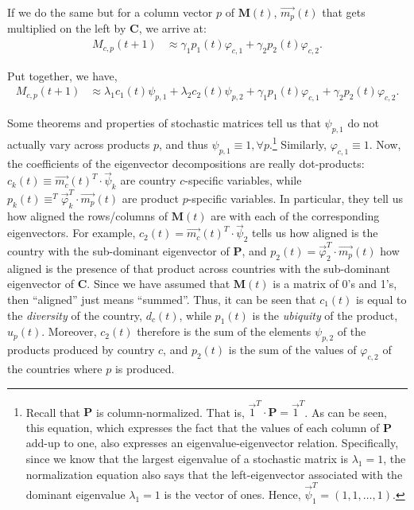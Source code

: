 \documentclass[12pt]{article}
\newcommand{\mtx}[1]{\mathbf{ #1}}
\begin{document}
If we do the same but for a column vector $p$ of $\mtx{M}(t)$, $\vec{m_p}(t)$ that gets multiplied on the left by $\mtx{C}$, we arrive at:
\begin{align*}
	M_{c,p}(t+1) &\approx \gamma_1 p_1(t) \varphi_{c,1} + \gamma_2 p_2(t) \varphi_{c,2}.
\end{align*}

Put together, we have,
\begin{align}
	M_{c,p}(t+1) &\approx \lambda_1 c_1(t) \psi_{p,1} + \lambda_2 c_2(t) \psi_{p,2} + \gamma_1 p_1(t) \varphi_{c,1} + \gamma_2 p_2(t) \varphi_{c,2}.
\label{eq_finalapprox}
\end{align}


Some theorems and properties of stochastic matrices tell us that $\psi_{p,1}$ do not actually vary across products $p$, and thus $\psi_{p,1}\equiv 1, \forall p$.\footnote{Recall that $\mtx{P}$ is column-normalized. That is, $\vec{1}^T\cdot\mtx{P}=\vec{1}^T$. As can be seen, this equation, which expresses the fact that the values of each column of $\mtx{P}$ add-up to one, also expresses an eigenvalue-eigenvector relation. Specifically, since we know that the largest eigenvalue of a stochastic matrix is $\lambda_1=1$, the normalization equation also says that the left-eigenvector associated with the dominant eigenvalue $\lambda_1=1$ is the vector of ones. Hence, $\vec{\psi}_1^T = (1,1,\ldots,1)$.} Similarly, $\varphi_{c,1}\equiv 1$. Now, the coefficients of the eigenvector decompositions are really dot-products: $c_k(t)\equiv \vec{m_c}(t)^T\cdot\vec{\psi}_k$ are country $c$-specific variables, while $p_k(t)\equiv ^T\vec{\varphi}_k^T\cdot\vec{m_p}(t)$ are product $p$-specific variables. In particular, they tell us how aligned the rows/columns of $\mtx{M}(t)$ are with each of the corresponding eigenvectors. For example, $c_2(t) = \vec{m_c}(t)^T\cdot\vec{\psi}_2$ tells us how aligned is the country with the sub-dominant eigenvector of $\mtx{P}$, and $p_2(t) = \vec{\varphi}_2^T\cdot\vec{m_p}(t)$ how aligned is the presence of that product across countries with the sub-dominant eigenvector of $\mtx{C}$. Since we have assumed that $\mtx{M}(t)$ is a matrix of 0's and 1's, then ``aligned'' just means ``summed''. Thus, it can be seen that $c_1(t)$ is equal to the \emph{diversity} of the country, $d_c(t)$, while $p_1(t)$ is the \emph{ubiquity} of the product, $u_p(t)$. Moreover, $c_2(t)$ therefore is the sum of the elements $\psi_{p,2}$ of the products produced by country $c$, and $p_2(t)$ is the sum of the values of $\varphi_{c,2}$ of the countries where $p$ is produced.
\end{document}
